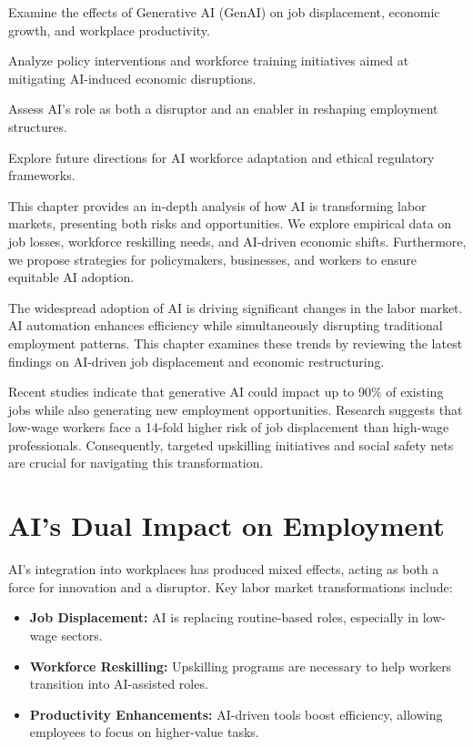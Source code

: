 \documentclass[a4paper,headinclude=on,footinclude=on,12pt,oneside]{scrbook}
\begin{document}
\begin{arrows}
	\item Examine the effects of Generative AI (GenAI) on job displacement, economic growth, and workplace productivity.
	\item Analyze policy interventions and workforce training initiatives aimed at mitigating AI-induced economic disruptions.
	\item Assess AI’s role as both a disruptor and an enabler in reshaping employment structures.
	\item Explore future directions for AI workforce adaptation and ethical regulatory frameworks.
\end{arrows}

This chapter provides an in-depth analysis of how AI is transforming labor markets, presenting both risks and opportunities. We explore empirical data on job losses, workforce reskilling needs, and AI-driven economic shifts. Furthermore, we propose strategies for policymakers, businesses, and workers to ensure equitable AI adoption.


The widespread adoption of AI is driving significant changes in the labor market. AI automation enhances efficiency while simultaneously disrupting traditional employment patterns. This chapter examines these trends by reviewing the latest findings on AI-driven job displacement and economic restructuring.

Recent studies indicate that generative AI could impact up to 90\% of existing jobs while also generating new employment opportunities. Research suggests that low-wage workers face a 14-fold higher risk of job displacement than high-wage professionals. Consequently, targeted upskilling initiatives and social safety nets are crucial for navigating this transformation.

\section{AI’s Dual Impact on Employment}

AI’s integration into workplaces has produced mixed effects, acting as both a force for innovation and a disruptor. Key labor market transformations include:
\begin{itemize}
	\item \textbf{Job Displacement:} AI is replacing routine-based roles, especially in low-wage sectors.
	\item \textbf{Workforce Reskilling:} Upskilling programs are necessary to help workers transition into AI-assisted roles.
	\item \textbf{Productivity Enhancements:} AI-driven tools boost efficiency, allowing employees to focus on higher-value tasks.
\end{itemize}
\end{document}
